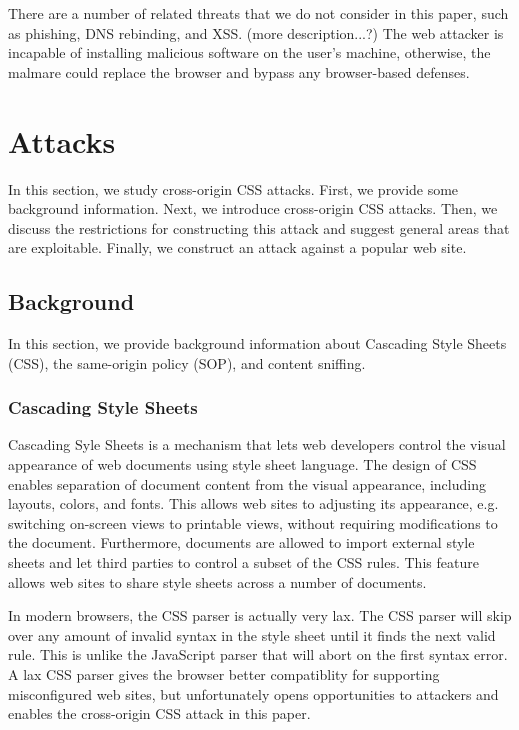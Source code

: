 \documentclass{acm_proc_article-sp}
\begin{document}
There are a number of related threats that we do not consider in this paper, such as phishing, DNS rebinding, and XSS.
(more description...?)
The web attacker is incapable of installing malicious software on the user's machine, otherwise, the malmare could replace the browser and bypass any browser-based defenses.

\section{Attacks}
In this section, we study cross-origin CSS attacks. First, we provide some background information. Next, we introduce cross-origin CSS attacks. Then, we discuss the restrictions for constructing this attack and suggest general areas that are exploitable. Finally, we construct an attack against a popular web site.

\subsection{Background}
In this section, we provide background information about Cascading Style Sheets (CSS), the same-origin policy (SOP), and content sniffing.

\subsubsection{Cascading Style Sheets}
Cascading Syle Sheets\cite{css} is a mechanism that lets web developers control the visual appearance of web documents using style sheet language. The design of CSS enables separation of document content from the visual appearance, including layouts, colors, and fonts. This allows web sites to adjusting its appearance, e.g. switching on-screen views to printable views, without requiring modifications to the document. Furthermore, documents are allowed to import external style sheets and let third parties to control a subset of the CSS rules. This feature allows web sites to share style sheets across a number of documents.

In modern browsers, the CSS parser is actually very lax. The CSS parser will skip over any amount of invalid syntax in the style sheet until it finds the next valid rule. This is unlike the JavaScript parser that will abort on the first syntax error. A lax CSS parser gives the browser better compatiblity for supporting misconfigured web sites, but unfortunately opens opportunities to attackers and enables the cross-origin CSS attack in this paper.
\end{document}
